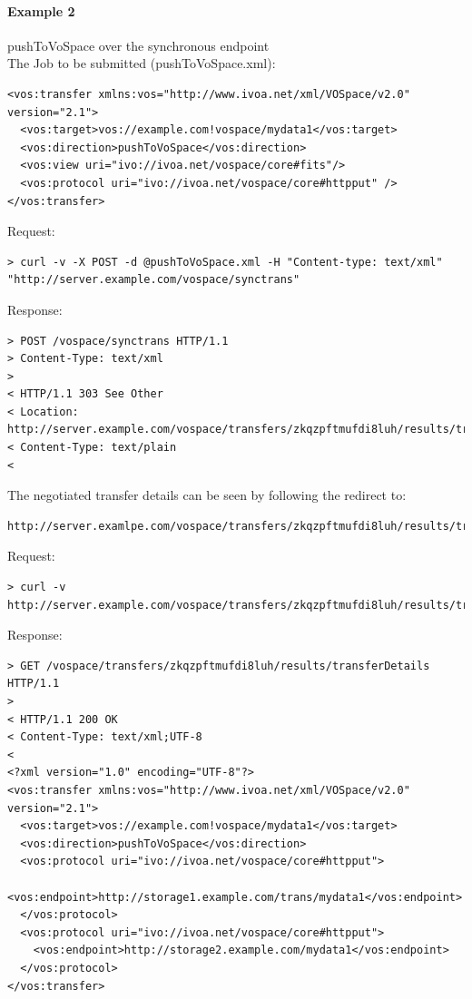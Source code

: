 \documentclass[11pt,a4paper]{ivoa}
\begin{document}
\paragraph{Example 2}
pushToVoSpace over the synchronous endpoint
\\[5px]
\noindent
The Job to be submitted (pushToVoSpace.xml):
\begin{lstlisting}
<vos:transfer xmlns:vos="http://www.ivoa.net/xml/VOSpace/v2.0" version="2.1">
  <vos:target>vos://example.com!vospace/mydata1</vos:target>
  <vos:direction>pushToVoSpace</vos:direction>
  <vos:view uri="ivo://ivoa.net/vospace/core#fits"/>
  <vos:protocol uri="ivo://ivoa.net/vospace/core#httpput" />
</vos:transfer>
\end{lstlisting}
Request:
\begin{lstlisting}
> curl -v -X POST -d @pushToVoSpace.xml -H "Content-type: text/xml" "http://server.example.com/vospace/synctrans"
\end{lstlisting}
Response:
\begin{lstlisting}
> POST /vospace/synctrans HTTP/1.1
> Content-Type: text/xml
>
< HTTP/1.1 303 See Other
< Location: http://server.example.com/vospace/transfers/zkqzpftmufdi8luh/results/transferDetails
< Content-Type: text/plain
<
\end{lstlisting}
The negotiated transfer details can be seen by following the redirect to:
\begin{lstlisting}
http://server.examlpe.com/vospace/transfers/zkqzpftmufdi8luh/results/transferDetails
\end{lstlisting}
Request:
\begin{lstlisting}
> curl -v http://server.example.com/vospace/transfers/zkqzpftmufdi8luh/results/transferDetails
\end{lstlisting}
Response:
\begin{lstlisting}
> GET /vospace/transfers/zkqzpftmufdi8luh/results/transferDetails HTTP/1.1
>
< HTTP/1.1 200 OK
< Content-Type: text/xml;UTF-8
<
<?xml version="1.0" encoding="UTF-8"?>
<vos:transfer xmlns:vos="http://www.ivoa.net/xml/VOSpace/v2.0" version="2.1">
  <vos:target>vos://example.com!vospace/mydata1</vos:target>
  <vos:direction>pushToVoSpace</vos:direction>
  <vos:protocol uri="ivo://ivoa.net/vospace/core#httpput">
    <vos:endpoint>http://storage1.example.com/trans/mydata1</vos:endpoint>
  </vos:protocol>
  <vos:protocol uri="ivo://ivoa.net/vospace/core#httpput">
    <vos:endpoint>http://storage2.example.com/mydata1</vos:endpoint>
  </vos:protocol>
</vos:transfer>
\end{lstlisting}
\end{document}

